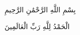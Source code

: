 ﻿\documentclass{article}
\begin{document}
بِسْمِ اللَّهِ الرَّحْمَٰنِ الرَّحِيمِ

الْحَمْدُ لِلَّهِ رَبِّ الْعَالَمِينَ
\end{document}
